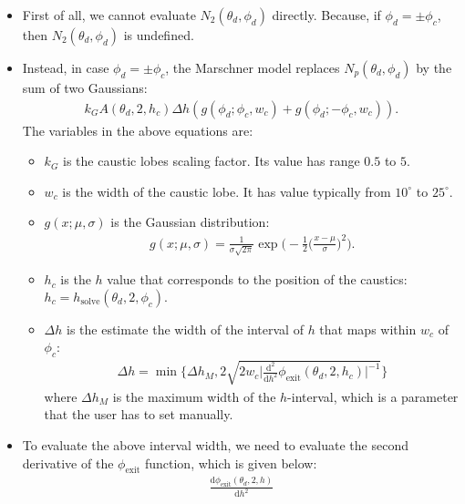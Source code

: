 \documentclass[10pt]{article}
\newcommand{\dee}{\mathrm{d}}
\newcommand{\exit}{\mathrm{exit}}
\newcommand{\solve}{\mathrm{solve}}
\begin{document}
  \begin{itemize}
    \item First of all, we cannot evaluate $N_2(\theta_d, \phi_d)$ directly. Because, if $\phi_d = \pm \phi_c$, then $N_2(\theta_d, \phi_d)$ is undefined.
    
    \item Instead, in case $\phi_d = \pm \phi_c$, the Marschner
      model replaces $N_p(\theta_d, \phi_d)$ by the sum of
      two Gaussians:
      \begin{align}
        k_G A(\theta_d, 2, h_c) \Delta h (g(\phi_d; \phi_c, w_c) +
        g(\phi_d; -\phi_c, w_c)).
        \label{caustic-value}
      \end{align}
      The variables in the above equations are:
      \begin{itemize}
        \item $k_G$ is the caustic lobes scaling factor. Its value
          has range $0.5$ to $5$.
        \item $w_c$ is the width of the caustic lobe. It has
          value typically from $10^\circ$ to $25^\circ$.
        \item $g(x;\mu,\sigma)$ is the Gaussian distribution:
          \begin{align*}
            g(x;\mu,\sigma) = \frac{1}{\sigma \sqrt{2\pi}}
            \exp\bigg(-\frac{1}{2}\bigg( \frac{x-\mu}{\sigma} \bigg)^2 \bigg).
          \end{align*}
        \item $h_c$ is the $h$ value that corresponds to the
          position of the caustics: $h_c = h_\solve(\theta_d, 2, \phi_c).$
        \item $\Delta h$ is the estimate the width 
          of the interval of $h$ that maps 
          within $w_c$ of $\phi_c$:
      \begin{align}
        \Delta h = \min \bigg\{ \Delta h_M, 
        2 \sqrt{2w_c \Big| \frac{\dee^2 }{\dee h^2} \phi_\exit(\theta_d, 2, h_c) \Big|^{-1}  } \bigg\}
        \label{delta-h}
      \end{align}
      where $\Delta h_M$ is the maximum width of the $h$-interval,
      which is a parameter that the user has to set manually.
      \end{itemize}      
    \item To evaluate the above interval width, we need to evaluate
      the second derivative of the $\phi_\exit$ function,
      which is given below:
      \begin{align*}
        \frac{\dee \phi_\exit(\theta_d, 2, h) }{\dee h^2}

\end{align*}
\end{itemize}
\end{document}
